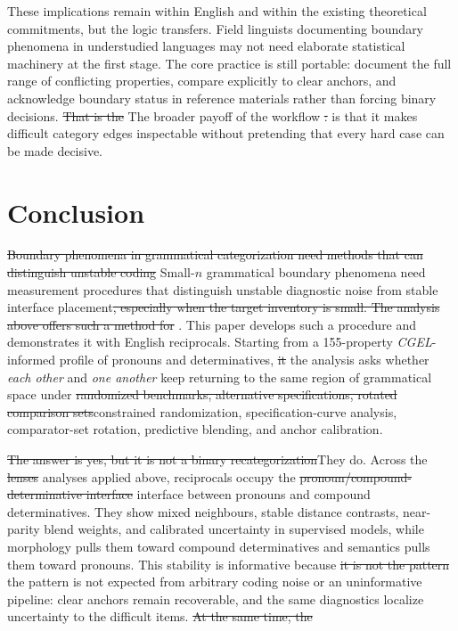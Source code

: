 \documentclass[12pt]{article}
\providecommand{\mention}[1]{\textit{#1}}
\providecommand{\DIFaddtex}[1]{{\protect\color{DIFgreen}#1}} %
\providecommand{\DIFdeltex}[1]{{\protect\color{red}\sout{#1}}}                      %
\providecommand{\DIFaddbegin}{} %
\providecommand{\DIFaddend}{} %
\providecommand{\DIFdelbegin}{} %
\providecommand{\DIFdelend}{} %
\providecommand{\DIFadd}[1]{\texorpdfstring{\DIFaddtex{#1}}{#1}} %
\providecommand{\DIFdel}[1]{\texorpdfstring{\DIFdeltex{#1}}{}} %
\newcommand{\DIFscaledelfig}{0.5}
\newlength{\DIFdelgraphicswidth} %
\newlength{\DIFdelgraphicsheight} %
\newcommand{\DIFaddincludegraphics}[2][]{{\color{DIFgreen}\fbox{\DIFOincludegraphics[#1]{#2}}}} %
\newcommand{\DIFdelincludegraphics}[2][]{%
\sbox{\DIFdelgraphicsbox}{\DIFOincludegraphics[#1]{#2}}%
\settoboxwidth{\DIFdelgraphicswidth}{\DIFdelgraphicsbox} %
\settoboxtotalheight{\DIFdelgraphicsheight}{\DIFdelgraphicsbox} %
\scalebox{\DIFscaledelfig}{%
\parbox[b]{\DIFdelgraphicswidth}{\usebox{\DIFdelgraphicsbox}\\[-\baselineskip] \rule{\DIFdelgraphicswidth}{0em}}\llap{\resizebox{\DIFdelgraphicswidth}{\DIFdelgraphicsheight}{%
\setlength{\unitlength}{\DIFdelgraphicswidth}%
\begin{picture}(1,1)%
\thicklines\linethickness{2pt} %
{\color[rgb]{1,0,0}\put(0,0){\framebox(1,1){}}}%
{\color[rgb]{1,0,0}\put(0,0){\line( 1,1){1}}}%
{\color[rgb]{1,0,0}\put(0,1){\line(1,-1){1}}}%
\end{picture}%
}\hspace*{3pt}}} %
} %
\DeclareRobustCommand{\DIFaddbegin}{\DIFOaddbegin \let\includegraphics\DIFaddincludegraphics} %
\DeclareRobustCommand{\DIFaddend}{\DIFOaddend \let\includegraphics\DIFOincludegraphics} %
\DeclareRobustCommand{\DIFdelbegin}{\DIFOdelbegin \let\includegraphics\DIFdelincludegraphics} %
\DeclareRobustCommand{\DIFdelend}{\DIFOaddend \let\includegraphics\DIFOincludegraphics} %
\begin{document}
These implications remain within English and within the existing theoretical commitments, but the logic transfers. Field linguists documenting boundary phenomena in understudied languages may not need elaborate statistical machinery at the first stage. The core practice is still portable: document the full range of conflicting properties, compare explicitly to clear anchors, and acknowledge boundary status in reference materials rather than forcing binary decisions. \DIFdelbegin \DIFdel{That is the }\DIFdelend \DIFaddbegin \DIFadd{The }\DIFaddend broader payoff of the workflow \DIFdelbegin \DIFdel{: }\DIFdelend \DIFaddbegin \DIFadd{is that }\DIFaddend it makes difficult category edges inspectable without pretending that every hard case can be made decisive.


\section{Conclusion}

\DIFdelbegin \DIFdel{Boundary phenomena in grammatical categorization need methods that can distinguish unstable coding }\DIFdelend \DIFaddbegin \DIFadd{Small-$n$ grammatical boundary phenomena need measurement procedures that distinguish unstable diagnostic }\DIFaddend noise from stable interface placement\DIFdelbegin \DIFdel{, especially when the target inventory is small. The analysis above offers such a method for }\DIFdelend \DIFaddbegin \DIFadd{. This paper develops such a procedure and demonstrates it with }\DIFaddend English reciprocals. Starting from a 155-property \textit{CGEL}-informed profile of pronouns and determinatives, \DIFdelbegin \DIFdel{it }\DIFdelend \DIFaddbegin \DIFadd{the analysis }\DIFaddend asks whether \mention{each other} and \mention{one another} keep returning to the same region of grammatical space under \DIFdelbegin \DIFdel{randomized benchmarks, alternative specifications, rotated comparison sets}\DIFdelend \DIFaddbegin \DIFadd{constrained randomization, specification-curve analysis, comparator-set rotation}\DIFaddend , predictive blending, and anchor calibration.

\DIFdelbegin \DIFdel{The answer is yes, but it is not a binary recategorization}\DIFdelend \DIFaddbegin \DIFadd{They do}\DIFaddend . Across the \DIFdelbegin \DIFdel{lenses }\DIFdelend \DIFaddbegin \DIFadd{analyses }\DIFaddend applied above, reciprocals occupy the \DIFdelbegin \DIFdel{pronoun/compound-determinative interface }\DIFdelend \DIFaddbegin \DIFadd{interface between pronouns and compound determinatives}\DIFaddend . They show mixed neighbours, stable distance contrasts, near-parity blend weights, and calibrated uncertainty in supervised models, while morphology pulls them toward compound determinatives and semantics pulls them toward pronouns. This stability is informative because \DIFdelbegin \DIFdel{it is not the pattern }\DIFdelend \DIFaddbegin \DIFadd{the pattern is not }\DIFaddend expected from arbitrary coding noise or an uninformative pipeline: clear anchors remain recoverable, and the same diagnostics localize uncertainty to the difficult items.
\DIFdelbegin \DIFdel{At the same time, the }\DIFdelend \DIFaddbegin 
\end{document}
